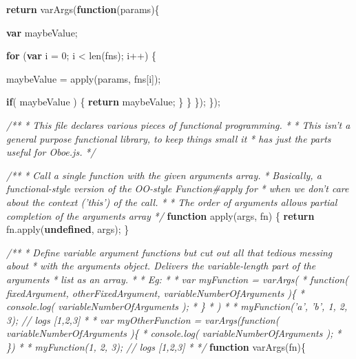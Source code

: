 \documentclass[]{article}
\newenvironment{Shaded}{}{}
\newcommand{\KeywordTok}[1]{\textcolor[rgb]{0.00,0.44,0.13}{\textbf{{#1}}}}
\newcommand{\DecValTok}[1]{\textcolor[rgb]{0.25,0.63,0.44}{{#1}}}
\newcommand{\CommentTok}[1]{\textcolor[rgb]{0.38,0.63,0.69}{\textit{{#1}}}}
\newcommand{\OtherTok}[1]{\textcolor[rgb]{0.00,0.44,0.13}{{#1}}}
\newcommand{\FunctionTok}[1]{\textcolor[rgb]{0.02,0.16,0.49}{{#1}}}
\newcommand{\NormalTok}[1]{{#1}}
\begin{document}
\begin{Shaded}
\begin{Highlighting}[]
      \KeywordTok{return} \FunctionTok{varArgs}\NormalTok{(}\KeywordTok{function}\NormalTok{(params)\{}
   
         \KeywordTok{var} \NormalTok{maybeValue;}
   
         \KeywordTok{for} \NormalTok{(}\KeywordTok{var} \NormalTok{i = }\DecValTok{0}\NormalTok{; i < }\FunctionTok{len}\NormalTok{(fns); i++) \{}
   
            \NormalTok{maybeValue = }\FunctionTok{apply}\NormalTok{(params, fns[i]);}
   
            \KeywordTok{if}\NormalTok{( maybeValue ) \{}
               \KeywordTok{return} \NormalTok{maybeValue;}
            \NormalTok{\}}
         \NormalTok{\}}
      \NormalTok{\});}
   \NormalTok{\});   }

\CommentTok{/**}
\CommentTok{ * This file declares various pieces of functional programming.}
\CommentTok{ * }
\CommentTok{ * This isn't a general purpose functional library, to keep things small it}
\CommentTok{ * has just the parts useful for Oboe.js.}
\CommentTok{ */}


\CommentTok{/**}
\CommentTok{ * Call a single function with the given arguments array.}
\CommentTok{ * Basically, a functional-style version of the OO-style Function#apply for }
\CommentTok{ * when we don't care about the context ('this') of the call.}
\CommentTok{ * }
\CommentTok{ * The order of arguments allows partial completion of the arguments array}
\CommentTok{ */}
\KeywordTok{function} \FunctionTok{apply}\NormalTok{(args, fn) \{}
   \KeywordTok{return} \OtherTok{fn}\NormalTok{.}\FunctionTok{apply}\NormalTok{(}\KeywordTok{undefined}\NormalTok{, args);}
\NormalTok{\}}

\CommentTok{/**}
\CommentTok{ * Define variable argument functions but cut out all that tedious messing about }
\CommentTok{ * with the arguments object. Delivers the variable-length part of the arguments}
\CommentTok{ * list as an array.}
\CommentTok{ * }
\CommentTok{ * Eg:}
\CommentTok{ * }
\CommentTok{ * var myFunction = varArgs(}
\CommentTok{ *    function( fixedArgument, otherFixedArgument, variableNumberOfArguments )\{}
\CommentTok{ *       console.log( variableNumberOfArguments );}
\CommentTok{ *    \}}
\CommentTok{ * )}
\CommentTok{ * }
\CommentTok{ * myFunction('a', 'b', 1, 2, 3); // logs [1,2,3]}
\CommentTok{ * }
\CommentTok{ * var myOtherFunction = varArgs(function( variableNumberOfArguments )\{}
\CommentTok{ *    console.log( variableNumberOfArguments );}
\CommentTok{ * \})}
\CommentTok{ * }
\CommentTok{ * myFunction(1, 2, 3); // logs [1,2,3]}
\CommentTok{ * }
\CommentTok{ */}
\KeywordTok{function} \FunctionTok{varArgs}\NormalTok{(fn)\{}


\end{Highlighting}
\end{Shaded}
\end{document}
